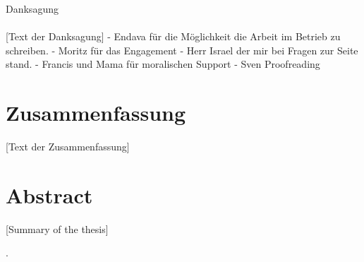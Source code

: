 \documentclass[oneside,bibliography=totocnumbered,BCOR=5mm]{scrbook}
\begin{document}
\thispagestyle{empty}
\vspace*{2.2cm}
\noindent
{\Huge Danksagung}\\
\vspace*{1.6cm} \\

[Text der Danksagung]
- Endava für die Möglichkeit die Arbeit im Betrieb zu schreiben.
- Moritz für das Engagement
- Herr Israel der mir bei Fragen zur Seite stand.
- Francis und Mama für moralischen Support
- Sven Proofreading

\newpage
\thispagestyle{empty}
\section*{Zusammenfassung}
[Text der Zusammenfassung]

\section*{Abstract}
[Summary of the thesis]


\clearpage

\tableofcontents
.
\newpage





\end{document}
